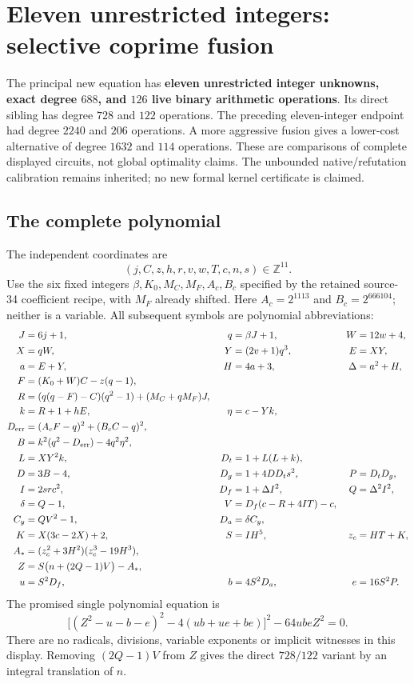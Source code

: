 \section{Eleven unrestricted integers: selective coprime fusion}
\label{sec:integer-fusion}

The principal new equation has \textbf{eleven unrestricted integer unknowns,
exact degree $688$, and $126$ live binary arithmetic operations}.
Its direct sibling has degree $728$ and $122$ operations.
The preceding eleven-integer endpoint had degree $2240$ and $206$ operations.
A more aggressive fusion gives a lower-cost alternative of degree $1632$
and $114$ operations. These are comparisons of complete displayed
circuits, not global optimality claims. The unbounded native/refutation
calibration remains inherited; no new formal kernel certificate is claimed.

\subsection{The complete polynomial}
The independent coordinates are
\[
 (j,C,z,h,r,v,w,T,c,n,s)\in\mathbb Z^{11}.
\]
Use the six fixed integers $\beta,K_0,M_C,M_F,A_c,B_c$ specified by the
retained source-34 coefficient recipe, with $M_F$ already shifted.
Here $A_c=2^{1113}$ and $B_c=2^{666104}$; neither is a variable.
All subsequent symbols are polynomial abbreviations:
\begin{align*}
 J&=6j+1,&q&=\beta J+1,& W&=12w+4,\\
 X&=qW,&Y&=(2v+1)q^3,& E&=XY,\\
 a&=E+Y,& H&=4a+3,&\Delta&=a^2+H,\\
 F&=(K_0+W)C-z(q-1),\\
 R&=(q(q-F)-C)(q^2-1)+(M_C+qM_F)J,\\
 k&=R+1+hE,&\eta&=c-Yk,\\
 D_{\rm err}&=(A_cF-q)^2+(B_cC-q)^2,\\
 B&=k^2(q^2-D_{\rm err})-4q^2\eta^2,\\
 L&=XY^2k,&D_t&=1+L(L+k),\\
 D&=3B-4,&D_g&=1+4DD_t s^2,&P&=D_tD_g,\\
 I&=2src^2,&D_f&=1+\Delta I^2,&Q&=\Delta^2I^2,\\
 \delta&=Q-1,&V&=D_f(c-R+4IT)-c,\\
 C_y&=QV^2-1,&D_a&=\delta C_y,\\
 K&=X(3c-2X)+2,&S&=IH^5,&z_c&=HT+K,\\
 A_*&=(z_c^2+3H^2)(z_c^3-19H^3),\\
 Z&=S\bigl(n+(2Q-1)V\bigr)-A_*,\\
 u&=S^2D_f,&b&=4S^2D_a,&e&=16S^2P.
\end{align*}
The promised single polynomial equation is
\begin{equation}\label{eq:integer-fusion}
 \boxed{\ \bigl[(Z^2-u-b-e)^2-4(ub+ue+be)\bigr]^2
                 -64ubeZ^2=0.\ }
\end{equation}
There are no radicals, divisions, variable exponents or implicit witnesses
in this display. Removing $(2Q-1)V$ from $Z$ gives the direct $728/122$
variant by an integral translation of $n$.

